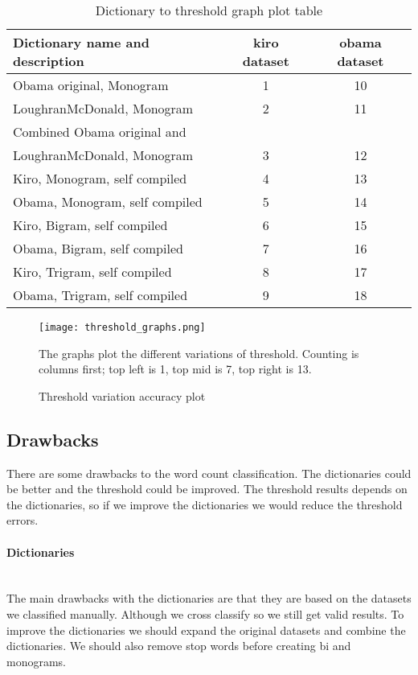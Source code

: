 \begin{table}
\centering
\label{tbl:dictionary_to_threshold}
\caption{Dictionary to threshold graph plot table}
\begin{tabular}{ l c c }
Dictionary name and description & kiro dataset & obama dataset \\ 
\hline
Obama original, Monogram & 1 & 10 \\
LoughranMcDonald, Monogram & 2 & 11 \\
Combined Obama original and \\ LoughranMcDonald, Monogram & 3 & 12 \\
Kiro, Monogram, self compiled & 4 & 13 \\
Obama, Monogram, self compiled & 5 & 14 \\
Kiro, Bigram, self compiled & 6 & 15 \\
Obama, Bigram, self compiled & 7 & 16 \\
Kiro, Trigram, self compiled & 8 & 17 \\
Obama, Trigram, self compiled & 9 & 18 \\
\end{tabular}
\end{table}

\begin{figure}[htb]
    \centering
    \texttt{[image: threshold\_graphs.png]} 
    \label{fig:threshold_graphs}
    \caption{Threshold variation accuracy plot}
The graphs plot the different variations of threshold. Counting is
columns first; top left is 1, top mid is 7, top right is 13.
\end{figure}

\subsection{Drawbacks}
There are some drawbacks to the word count classification. The dictionaries
could be better and the threshold could be improved. The threshold results
depends on the dictionaries, so if we improve the dictionaries we would reduce
the threshold errors. 

\paragraph{Dictionaries}
\hspace{0pt}\\
The main drawbacks with the dictionaries are that they are based on the
datasets we classified manually. Although we cross classify so we still get
valid results. To improve the dictionaries we should expand the original
datasets and combine the dictionaries. We should also remove stop words before
creating bi and monograms.

